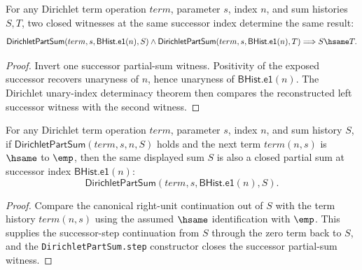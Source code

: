 \begin{theorem}
\label{thm:lfunction-dirichlet-part-sum-successor-deterministic}
For any Dirichlet term operation $term$, parameter $s$, index $n$, and sum
histories $S,T$, two closed witnesses at the same successor index determine
the same result:
$$
\mathsf{DirichletPartSum}(term,s,\mathsf{BHist.e1}(n),S)\land
\mathsf{DirichletPartSum}(term,s,\mathsf{BHist.e1}(n),T)
\Longrightarrow S\hsame T.
$$
\end{theorem}
\begin{proof}
Invert one successor partial-sum witness. Positivity of the exposed successor
recovers unaryness of $n$, hence unaryness of $\mathsf{BHist.e1}(n)$. The
Dirichlet unary-index determinacy theorem then compares the reconstructed
left successor witness with the second witness.
\end{proof}

\begin{theorem}
\label{thm:lfunction-dirichlet-part-sum-zero-term-successor-stable}
For any Dirichlet term operation $term$, parameter $s$, index $n$, and sum
history $S$, if
$\mathsf{DirichletPartSum}(term,s,n,S)$ holds and the next term
$term(n,s)$ is $\hsame$ to $\emp$, then the same displayed sum $S$ is also a
closed partial sum at successor index $\mathsf{BHist.e1}(n)$:
$$
\mathsf{DirichletPartSum}(term,s,\mathsf{BHist.e1}(n),S).
$$
\end{theorem}
\begin{proof}
Compare the canonical right-unit continuation out of $S$ with the term
history $term(n,s)$ using the assumed $\hsame$ identification with $\emp$.
This supplies the successor-step continuation from $S$ through the zero term
back to $S$, and the \texttt{DirichletPartSum.step} constructor closes the
successor partial-sum witness.
\end{proof}

